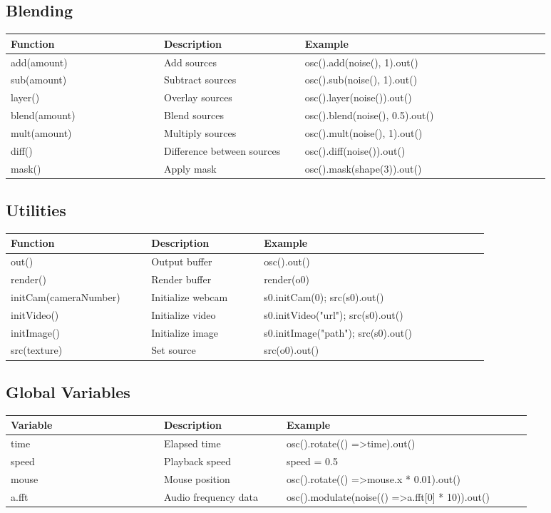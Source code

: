\documentclass[9pt,oneside]{amsart}
\begin{document}
\subsection*{Blending}
\begin{tabular}{L{0.25\linewidth}L{0.23\linewidth}L{0.40\linewidth}}
\toprule
\textbf{Function} & \textbf{Description} & \textbf{Example} \\
\midrule
add(amount) & Add sources & osc().add(noise(), 1).out() \\
sub(amount) & Subtract sources & osc().sub(noise(), 1).out() \\
layer() & Overlay sources & osc().layer(noise()).out() \\
blend(amount) & Blend sources & osc().blend(noise(), 0.5).out() \\
mult(amount) & Multiply sources & osc().mult(noise(), 1).out() \\
diff() & Difference between sources & osc().diff(noise()).out() \\
mask() & Apply mask & osc().mask(shape(3)).out() \\
\bottomrule
\end{tabular}

\subsection*{Utilities}
\begin{tabular}{L{0.25\linewidth}L{0.20\linewidth}L{0.40\linewidth}}
\toprule
\textbf{Function} & \textbf{Description} & \textbf{Example} \\
\midrule
out() & Output buffer & osc().out() \\
render() & Render buffer & render(o0) \\
initCam(cameraNumber) & Initialize webcam & s0.initCam(0); src(s0).out() \\
initVideo() & Initialize video & s0.initVideo("url"); src(s0).out() \\
initImage() & Initialize image & s0.initImage("path"); src(s0).out() \\
src(texture) & Set source & src(o0).out() \\
\bottomrule
\end{tabular}

\subsection*{Global Variables}
\begin{tabular}{L{0.25\linewidth}L{0.20\linewidth}L{0.40\linewidth}}
\toprule
\textbf{Variable} & \textbf{Description} & \textbf{Example} \\
\midrule
time & Elapsed time & osc().rotate(() =\textgreater  time).out() \\
speed & Playback speed & speed = 0.5 \\
mouse & Mouse position & osc().rotate(() =\textgreater  mouse.x * 0.01).out() \\
a.fft & Audio frequency data & osc().modulate(noise(() =\textgreater  a.fft[0] * 10)).out() \\
\bottomrule
\end{tabular}
\end{document}
